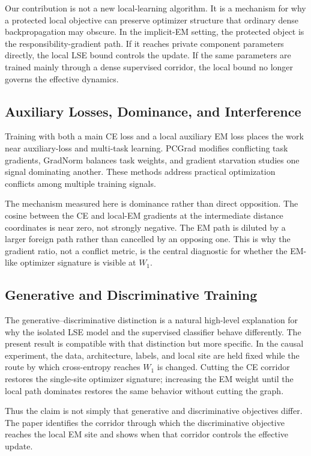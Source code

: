 Our contribution is not a new local-learning algorithm. It is a mechanism for
why a protected local objective can preserve optimizer structure that
ordinary dense backpropagation may obscure. In the implicit-EM setting, the
protected object is the responsibility-gradient path. If it reaches private
component parameters directly, the local LSE bound controls the update. If
the same parameters are trained mainly through a dense supervised corridor,
the local bound no longer governs the effective dynamics.

\subsection{Auxiliary Losses, Dominance, and Interference}
Training with both a main CE loss and a local auxiliary EM loss places the
work near auxiliary-loss and multi-task learning. PCGrad
\citep{yu2020pcgrad} modifies conflicting task gradients, GradNorm
\citep{chen2018gradnorm} balances task weights, and gradient starvation
\citep{pezeshki2021gradient} studies one signal dominating another. These
methods address practical optimization conflicts among multiple training
signals.

The mechanism measured here is dominance rather than direct opposition. The
cosine between the CE and local-EM gradients at the intermediate distance
coordinates is near zero, not strongly negative. The EM path is diluted by a
larger foreign path rather than cancelled by an opposing one. This is why the
gradient ratio, not a conflict metric, is the central diagnostic for whether
the EM-like optimizer signature is visible at $W_1$.

\subsection{Generative and Discriminative Training}
The generative--discriminative distinction \citep{ng2002discriminative} is a
natural high-level explanation for why the isolated LSE model and the
supervised classifier behave differently. The present result is compatible
with that distinction but more specific. In the causal experiment, the data,
architecture, labels, and local site are held fixed while the route by which
cross-entropy reaches $W_1$ is changed. Cutting the CE corridor restores the
single-site optimizer signature; increasing the EM weight until the local
path dominates restores the same behavior without cutting the graph.

Thus the claim is not simply that generative and discriminative objectives
differ. The paper identifies the corridor through which the discriminative
objective reaches the local EM site and shows when that corridor controls the
effective update.

